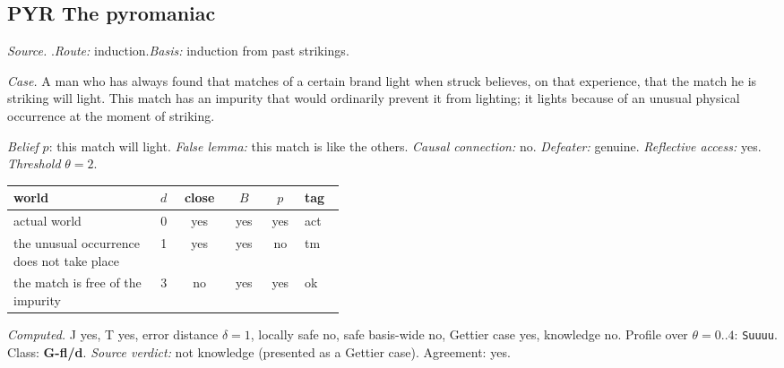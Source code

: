 \subsection*{PYR \enspace The pyromaniac}
\noindent\textit{Source.} \citet{Skyrms1967}.\quad \textit{Route:} induction.\quad \textit{Basis:} induction from past strikings.\par
\noindent\textit{Case.} A man who has always found that matches of a certain brand light when struck believes, on that experience, that the match he is striking will light. This match has an impurity that would ordinarily prevent it from lighting; it lights because of an unusual physical occurrence at the moment of striking.\par
\noindent\textit{Belief} $p$: this match will light.
 \textit{False lemma:} this match is like the others. \textit{Causal connection:} no. \textit{Defeater:} genuine. \textit{Reflective access:} yes. \textit{Threshold} $\theta = 2$.\par
\begin{center}\begin{tabular}{@{}p{0.43\linewidth}rcccl@{}}
world & $d$ & close & $B$ & $p$ & tag \\ \midrule
actual world & 0 & yes & yes & yes & act \\
the unusual occurrence does not take place & 1 & yes & yes & no & tm \\
the match is free of the impurity & 3 & no & yes & yes & ok \\
\end{tabular}\end{center}
\noindent\textit{Computed.} J yes, T yes, error distance $\delta = 1$, locally safe no, safe basis-wide no, Gettier case yes, knowledge no. Profile over $\theta = 0..4$: \texttt{Suuuu}. Class: \textbf{G-fl/d}.
 \textit{Source verdict:} not knowledge (presented as a Gettier case). Agreement: yes.
\par\medskip
{}
